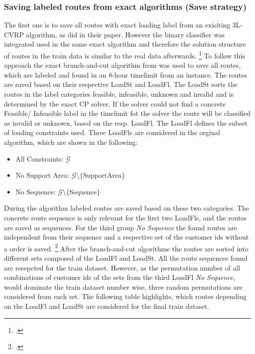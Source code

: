 \subsubsection{Saving labeled routes from exact algorithms (Save strategy)}
The first one is to save all routes with exact loading label from an exisiting \gls{3L-CVRP}
algorithm, as \cite{zhang_learning-based_2022} did in their paper. However the binary classifier
was integrated used in the same exact algorithm
and therefore the solution structure of routes in the train data is similar to the real data afterwards. \footcite[cf.][]{zhang_learning-based_2022}
To follow this approach the exact branch-and-cut algorithm from \cite{tamke_branch-and-cut_2024} was
used to save all routes, which are labeled and found in an 8-hour timelimit from an instance. The routes
are saved based on their respective \gls{LoadSt} and \gls{LoadFl}. The \gls{LoadSt} sorts the routes in the
label categories feasible, infeasible, unknown and invalid and is determined by the exact \gls{CP} solver.
If the solver could not find a concrete Feasible/ Infeasible label in the timelimit fot the solver the route
will be classified as invalid or unknown, based on the resp. \gls{LoadFl}.
The \gls{LoadFl} defines the subset of
loading constraints used. Three \glspl{LoadFl} are considered in the orginal algorithm, which are shown
in the following:
\begin{itemize}
    \item All Constraints: $\mathcal{G}$
    \item No Support Area: $\mathcal{G}\setminus \{\text{SupportArea}\}$
    \item No Sequence: $\mathcal{G}\setminus \{\text{Sequence}\}$
\end{itemize}
During the algorithm labeled routes are saved based on these two categories. The concrete route sequence
is only relevant for the first two \glspl{LoadFl}, and the routes are saved as sequences. For the third
group \textit{No Sequence} the found routes are independent from their sequence and a respective set
of the customer ids without a order is saved. \footcites[Retrieved from][]{tamke_repository_2024}[cf.][]{tamke_branch-and-cut_2024}
After the branch-and-cut algorithme the routes are sorted into different sets composed of the \gls{LoadFl} and \gls{LoadSt}.
All the route sequences found are resepcted for the train dataset. However, as the permutation number of all combinations
of customer ids of the sets from the third \gls{LoadFl} \textit{No Sequence}, would dominate the train dataset number wise,
three random permutations are considered from each set. The following table highlights, which routes depending on the
\gls{LoadFl} and \gls{LoadSt} are considered for the final train dataset.

